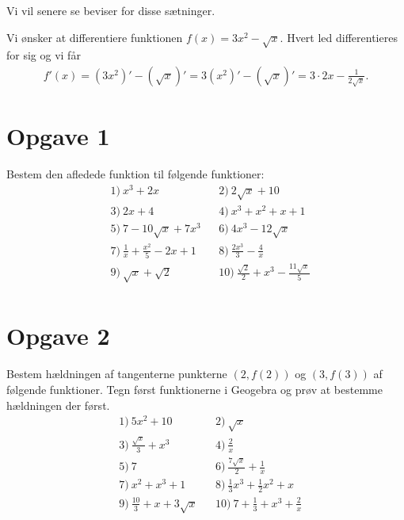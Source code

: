 Vi vil senere se beviser for disse sætninger. 
\begin{exa}
Vi ønsker at differentiere funktionen $f(x) = 3x^2-\sqrt{x}$. Hvert led differentieres for sig og vi får
\begin{align*}
f'(x) = (3x^2)' -(\sqrt{x})' = 3(x^2)' - (\sqrt{x})' = 3\cdot 2x - \frac{1}{2\sqrt{x}}.
\end{align*}
\section*{Opgave 1}
Bestem den afledede funktion til følgende funktioner:
\begin{align*}
&1) \ x^3+2x  &&2) \  2\sqrt{x}+10  \\
&3) \ 2x+4  &&4) \ x^3+x^2+x+1   \\
&5) \ 7-10\sqrt{x}+7x^3 &&6) \ 4x^3-12\sqrt{x}    \\
&7) \ \frac{1}{x} + \frac{x^2}{5} -2x +1 &&8) \  \frac{2x^3}{3}-\frac{4}{x}   \\
&9) \ \sqrt{x}+\sqrt{2}  &&10) \  \frac{\sqrt{2}}{2}+x^3-\frac{11\sqrt{x}}{5}  \\
\end{align*}
\section*{Opgave 2}
Bestem hældningen af tangenterne punkterne $(2,f(2))$ og $ (3,f(3))$ af følgende funktioner. Tegn først funktionerne i Geogebra og prøv at bestemme hældningen der først. 
\begin{align*}
&1) \ 5x^2+10   &&2) \ \sqrt{x}    \\
&3) \ \frac{\sqrt{x}}{3} + x^3  &&4) \ \frac{2}{x}   \\
&5) \ 7   &&6) \ \frac{7\sqrt{x}}{2} + \frac{1}{x}   \\
&7) \ x^2+x^3+1  &&8) \ \frac{1}{3}x^3+\frac{1}{2}x^2 + x    \\
&9) \ \frac{10}{3} + x+3\sqrt{x}   &&10) \ 7+\frac{1}{3} + x^3 + \frac{2}{x}    \\
\end{align*} 
\end{exa}